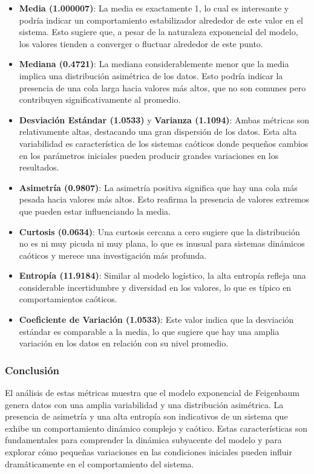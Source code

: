 \documentclass[11pt]{article}
\begin{document}
\begin{itemize}
\item
  \textbf{Media (1.000007)}: La media es exactamente 1, lo cual es
  interesante y podría indicar un comportamiento estabilizador alrededor
  de este valor en el sistema. Esto sugiere que, a pesar de la
  naturaleza exponencial del modelo, los valores tienden a converger o
  fluctuar alrededor de este punto.
\item
  \textbf{Mediana (0.4721)}: La mediana considerablemente menor que la
  media implica una distribución asimétrica de los datos. Esto podría
  indicar la presencia de una cola larga hacia valores más altos, que no
  son comunes pero contribuyen significativamente al promedio.
\item
  \textbf{Desviación Estándar (1.0533)} y \textbf{Varianza (1.1094)}:
  Ambas métricas son relativamente altas, destacando una gran dispersión
  de los datos. Esta alta variabilidad es característica de los sistemas
  caóticos donde pequeños cambios en los parámetros iniciales pueden
  producir grandes variaciones en los resultados.
\item
  \textbf{Asimetría (0.9807)}: La asimetría positiva significa que hay
  una cola más pesada hacia valores más altos. Esto reafirma la
  presencia de valores extremos que pueden estar influenciando la media.
\item
  \textbf{Curtosis (0.0634)}: Una curtosis cercana a cero sugiere que la
  distribución no es ni muy picuda ni muy plana, lo que es inusual para
  sistemas dinámicos caóticos y merece una investigación más profunda.
\item
  \textbf{Entropía (11.9184)}: Similar al modelo logístico, la alta
  entropía refleja una considerable incertidumbre y diversidad en los
  valores, lo que es típico en comportamientos caóticos.
\item
  \textbf{Coeficiente de Variación (1.0533)}: Este valor indica que la
  desviación estándar es comparable a la media, lo que sugiere que hay
  una amplia variación en los datos en relación con su nivel promedio.
\end{itemize}

\hypertarget{conclusiuxf3n}{%
\subsubsection{Conclusión}\label{conclusiuxf3n}}

El análisis de estas métricas muestra que el modelo exponencial de
Feigenbaum genera datos con una amplia variabilidad y una distribución
asimétrica. La presencia de asimetría y una alta entropía son
indicativos de un sistema que exhibe un comportamiento dinámico complejo
y caótico. Estas características son fundamentales para comprender la
dinámica subyacente del modelo y para explorar cómo pequeñas variaciones
en las condiciones iniciales pueden influir dramáticamente en el
comportamiento del sistema.
\end{document}
